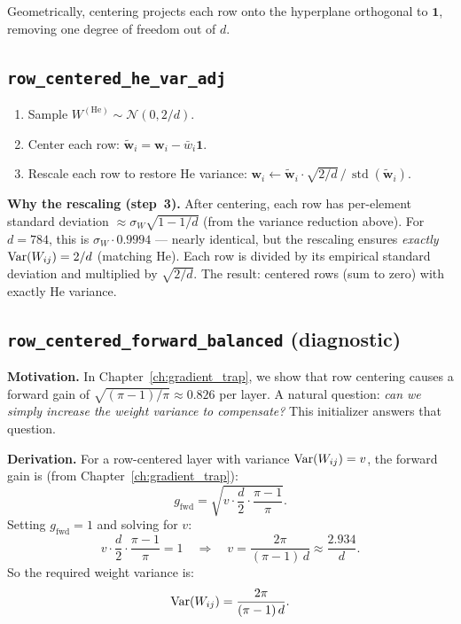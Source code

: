 \noindent
Geometrically, centering projects each row onto the hyperplane
orthogonal to $\bm{1}$, removing one degree of freedom out of $d$.

\subsection{\texttt{row\_centered\_he\_var\_adj}}
\label{sec:rc_var_adj}

\begin{enumerate}
  \item Sample $W^{(\mathrm{He})} \sim \mathcal{N}(0, 2/d)$.
  \item Center each row: $\tilde{\bm{w}}_i = \bm{w}_i - \bar{w}_i \bm{1}$.
  \item Rescale each row to restore He variance:
        $\bm{w}_i \leftarrow \tilde{\bm{w}}_i \cdot
        \sqrt{2/d}\,/\,\operatorname{std}(\tilde{\bm{w}}_i)$.
\end{enumerate}

\textbf{Why the rescaling (step~3).}
After centering, each row has per-element standard deviation
$\approx \sigma_W\sqrt{1 - 1/d}$ (from the variance reduction above).
For $d = 784$, this is $\sigma_W \cdot 0.9994$ --- nearly identical,
but the rescaling ensures \emph{exactly} $\operatorname{Var}(W_{ij}) = 2/d$
(matching He).  Each row is divided by its empirical standard deviation
and multiplied by $\sqrt{2/d}$.
The result: centered rows (sum to zero) with exactly He variance.

\subsection{\texttt{row\_centered\_forward\_balanced} (diagnostic)}
\label{sec:rc_fwd_balanced}

\textbf{Motivation.}
In Chapter~\ref{ch:gradient_trap}, we show that row centering causes
a forward gain of $\sqrt{(\pi-1)/\pi} \approx 0.826$ per layer.
A natural question: \emph{can we simply increase the weight variance
to compensate?}  This initializer answers that question.

\textbf{Derivation.}
For a row-centered layer with variance $\operatorname{Var}(W_{ij}) = v$, the forward
gain is (from Chapter~\ref{ch:gradient_trap}):
\[
  g_{\mathrm{fwd}} = \sqrt{v \cdot \frac{d}{2} \cdot \frac{\pi-1}{\pi}}.
\]
Setting $g_{\mathrm{fwd}} = 1$ and solving for $v$:
\[
  v \cdot \frac{d}{2} \cdot \frac{\pi-1}{\pi} = 1
  \quad\Longrightarrow\quad
  v = \frac{2\pi}{(\pi-1)\,d} \approx \frac{2.934}{d}.
\]
So the required weight variance is:
\begin{equation}\label{eq:fwd_balanced_var}
  \operatorname{Var}(W_{ij}) = \frac{2\pi}{(\pi-1)\,d}.
\end{equation}

